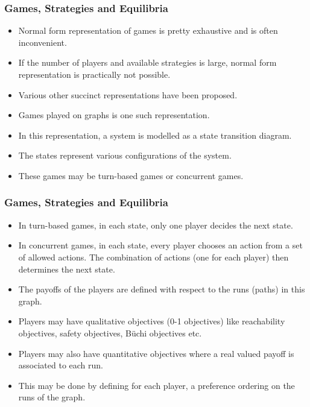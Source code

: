 \documentclass{beamer}
\begin{document}
\begin{frame}
 \frametitle{Games, Strategies and Equilibria}
\begin{itemize}
	\item Normal form representation of games is pretty exhaustive and is often inconvenient.
	\item If the number of players and available strategies is large, normal form representation is practically not possible.
	\item Various other succinct representations have been proposed.
	\item Games played on graphs is one such representation.
	\item In this representation, a system is modelled as a state transition diagram.
	\item The states represent various configurations of the system.
	\item These games may be turn-based games or concurrent games.
\end{itemize}
\end{frame}

\begin{frame}
 \frametitle{Games, Strategies and Equilibria}
\begin{itemize}
	\item In turn-based games, in each state, only one player decides the next state.
	\item In concurrent games, in each state, every player chooses an action from a set of allowed actions. The combination of actions (one for each player) then determines the next state.
	\item The payoffs of the players are defined with respect to the runs (paths) in this graph.
	\item Players may have qualitative objectives (0-1 objectives) like reachability objectives, safety objectives, B{\"u}chi objectives etc.
	\item Players may also have quantitative objectives where a real valued payoff is associated to each run.
	\item This may be done by defining for each player, a preference ordering on the runs of the graph.
\end{itemize}
\end{frame}
\end{document}
